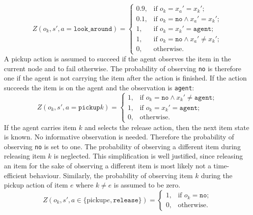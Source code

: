 \begin{equation}\label{eq:lookaround}
    Z(o_k, s', a=\texttt{look\_around}) = \begin{cases}
    0.9,& \text{if } o_k=x_a'=x_k';\\
    0.1, &\text{if } o_k=\texttt{no} \land x_a'=x_k';\\
    1,& \text{if }o_k=x_k'=\texttt{agent};\\
    1,& \text{if }o_k=\texttt{no}\land x_a'\neq x_k';
    \\0, &\text{otherwise}. \end{cases}
\end{equation}
A pickup action is assumed to succeed if the agent observes the item in the current node and to fail otherwise. The probability of observing \texttt{no} is therefore one if the agent is not carrying the item after the action is finished. If the action succeeds the item is on the agent and the observation is \texttt{agent}:
\begin{equation}\label{eq:pickup}
    Z(o_k, s', a=\texttt{pickup}k) = \begin{cases}
    1, &\text{if } o_k=\texttt{no} \land x_k'\neq \texttt{agent};\\
    1,& \text{if }o_k=x_k'=\texttt{agent};\\
    0, &\text{otherwise}. \end{cases}
\end{equation}
If the agent carries item $k$ and selects the release action, then the next item state is known. No informative observation is needed. Therefore the probability of observing \texttt{no} is set to one. The probability of observing a different item during releasing item $k$ is neglected. This simplification is well justified, since releasing an item for the sake of observing a different item is most likely not a time-efficient behaviour. Similarly, the probability of observing item $k$ during the pickup action of item $e$ where $k\neq e$ is assumed to be zero. 
\begin{equation}\label{eq:Orelease}
    Z(o_k, s', a\in\{\text{pickup}e, \texttt{release}\}) = \begin{cases}
    1,& \text{if } o_k=\texttt{no};\\
    0,& \text{otherwise}.\end{cases}
\end{equation}
